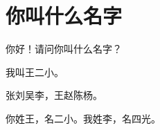 \documentclass[12pt,UTF-8,openany]{ctexbook}
\begin{document}
\clearpage

\begin{center}
    
    
\end{center}


\hanzibox{}\hanzibox{}\hanzibox{}\hanzibox{}\hspace{1em}\hanzibox{}\hanzibox{}\hanzibox{}\hanzibox{}

\hanzibox{}\hanzibox{}\hanzibox{}\hanzibox{}\hspace{1em}\hanzibox{}\hanzibox{}\hanzibox{}\hanzibox{}

\hanzibox{}\hanzibox{}\hanzibox{}\hanzibox{}\hspace{1em}\hanzibox{}\hanzibox{}\hanzibox{}\hanzibox{}

\hanzibox{}\hanzibox{}\hanzibox{}\hanzibox{}\hspace{1em}




\chapter{你叫什么名字}

\begin{large}
    
    你好！请问你叫什么名字？
    
    我叫王二小。
    
    张刘吴李，王赵陈杨。
    
    你姓王，名二小。我姓李，名四光。
    
\end{large}


\clearpage

\begin{center}
    
    
\end{center}


\hanzibox{}\hanzibox{}\hanzibox{}\hanzibox{}\hspace{1em}\hanzibox{}\hanzibox{}\hanzibox{}\hanzibox{}
\end{document}
